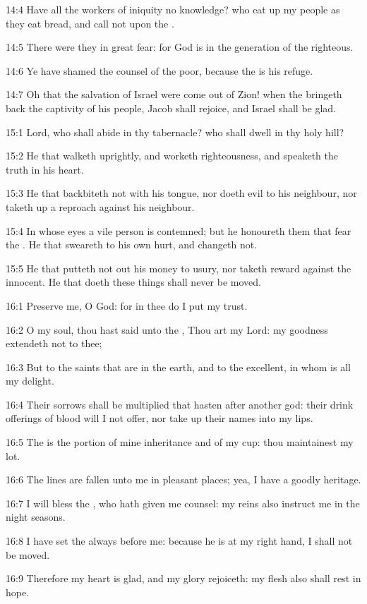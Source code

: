 14:4 Have all the workers of iniquity no knowledge? who eat up my people as they eat bread, and call not upon the \LORD.

14:5 There were they in great fear: for God is in the generation of the righteous.

14:6 Ye have shamed the counsel of the poor, because the \LORD is his refuge.

14:7 Oh that the salvation of Israel were come out of Zion! when the \LORD bringeth back the captivity of his people, Jacob shall rejoice, and Israel shall be glad.



15:1 Lord, who shall abide in thy tabernacle? who shall dwell in thy holy hill?

15:2 He that walketh uprightly, and worketh righteousness, and speaketh the truth in his heart.

15:3 He that backbiteth not with his tongue, nor doeth evil to his neighbour, nor taketh up a reproach against his neighbour.

15:4 In whose eyes a vile person is contemned; but he honoureth them that fear the \LORD. He that sweareth to his own hurt, and changeth not.

15:5 He that putteth not out his money to usury, nor taketh reward against the innocent. He that doeth these things shall never be moved.



16:1 Preserve me, O God: for in thee do I put my trust.

16:2 O my soul, thou hast said unto the \LORD, Thou art my Lord: my goodness extendeth not to thee;

16:3 But to the saints that are in the earth, and to the excellent, in whom is all my delight.

16:4 Their sorrows shall be multiplied that hasten after another god: their drink offerings of blood will I not offer, nor take up their names into my lips.

16:5 The \LORD is the portion of mine inheritance and of my cup: thou maintainest my lot.

16:6 The lines are fallen unto me in pleasant places; yea, I have a goodly heritage.

16:7 I will bless the \LORD, who hath given me counsel: my reins also instruct me in the night seasons.

16:8 I have set the \LORD always before me: because he is at my right hand, I shall not be moved.

16:9 Therefore my heart is glad, and my glory rejoiceth: my flesh also shall rest in hope.

